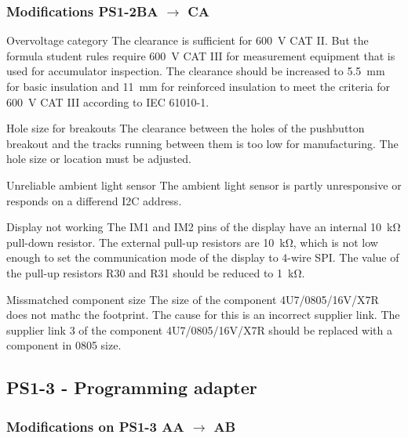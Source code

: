 \FloatBarrier

\subsubsection{Modifications PS1-2BA $\to$ CA}

\begin{ModTable}

\ModItemOpen
{Overvoltage category}
{The clearance is sufficient for \qty{600}{\volt} CAT II. But the formula student rules \cite{FSG:Rules_2026} require \qty{600}{\volt} CAT III for measurement equipment that is used for accumulator inspection. }
{The clearance should be increased to \qty{5.5}{\milli\meter} for basic insulation and \qty{11}{\milli\meter} for reinforced insulation to meet the criteria for \qty{600}{\volt} CAT III according to IEC 61010-1. }
{}
{}

\ModItemOpen
{Hole size for breakouts}
{The clearance between the holes of the pushbutton breakout and the tracks running between them is too low for manufacturing. }
{The hole size or location must be adjusted. }
{}
{}

\ModItemOpen
{Unreliable ambient light sensor}
{The ambient light sensor is partly unresponsive or responds on a differend \ac{I2C} address. }
{}
{}
{}

\ModItemOpen
{Display not working}
{The IM1 and IM2 pins of the display have an internal \qty{10}{\kilo\ohm} pull-down resistor. The external pull-up resistors are \qty{10}{\kilo\ohm}, which is not low enough to set the communication mode of the display to 4-wire \ac{SPI}. }
{The value of the pull-up resistors R30 and R31 should be reduced to \qty{1}{\kilo\ohm}. }
{}
{}

\ModItemOpen
{Missmatched component size}
{The size of the component 4U7/0805/16V/X7R does not mathc the footprint. The cause for this is an incorrect supplier link. }
{The supplier link 3 of the component 4U7/0805/16V/X7R should be replaced with a component in 0805 size. }
{}
{}

\end{ModTable}

\FloatBarrier

\subsection{PS1-3 - Programming adapter}

\subsubsection{Modifications on PS1-3 AA $\to$ AB}


